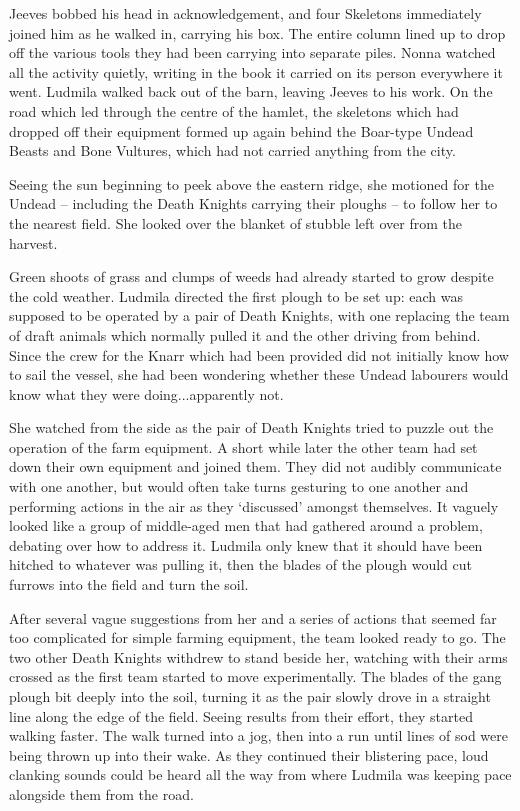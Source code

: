  

Jeeves bobbed his head in acknowledgement, and four Skeletons immediately joined him as he walked in, carrying his box. The entire column lined up to drop off the various tools they had been carrying into separate piles. Nonna watched all the activity quietly, writing in the book it carried on its person everywhere it went. Ludmila walked back out of the barn, leaving Jeeves to his work. On the road which led through the centre of the hamlet, the skeletons which had dropped off their equipment formed up again behind the Boar-type Undead Beasts and Bone Vultures, which had not carried anything from the city.

 

Seeing the sun beginning to peek above the eastern ridge, she motioned for the Undead – including the Death Knights carrying their ploughs – to follow her to the nearest field. She looked over the blanket of stubble left over from the harvest.

 

Green shoots of grass and clumps of weeds had already started to grow despite the cold weather. Ludmila directed the first plough to be set up: each was supposed to be operated by a pair of Death Knights, with one replacing the team of draft animals which normally pulled it and the other driving from behind. Since the crew for the Knarr which had been provided did not initially know how to sail the vessel, she had been wondering whether these Undead labourers would know what they were doing...apparently not.

 

She watched from the side as the pair of Death Knights tried to puzzle out the operation of the farm equipment. A short while later the other team had set down their own equipment and joined them. They did not audibly communicate with one another, but would often take turns gesturing to one another and performing actions in the air as they ‘discussed’ amongst themselves. It vaguely looked like a group of middle-aged men that had gathered around a problem, debating over how to address it. Ludmila only knew that it should have been hitched to whatever was pulling it, then the blades of the plough would cut furrows into the field and turn the soil.

 

After several vague suggestions from her and a series of actions that seemed far too complicated for simple farming equipment, the team looked ready to go. The two other Death Knights withdrew to stand beside her, watching with their arms crossed as the first team started to move experimentally. The blades of the gang plough bit deeply into the soil, turning it as the pair slowly drove in a straight line along the edge of the field. Seeing results from their effort, they started walking faster. The walk turned into a jog, then into a run until lines of sod were being thrown up into their wake. As they continued their blistering pace, loud clanking sounds could be heard all the way from where Ludmila was keeping pace alongside them from the road.

